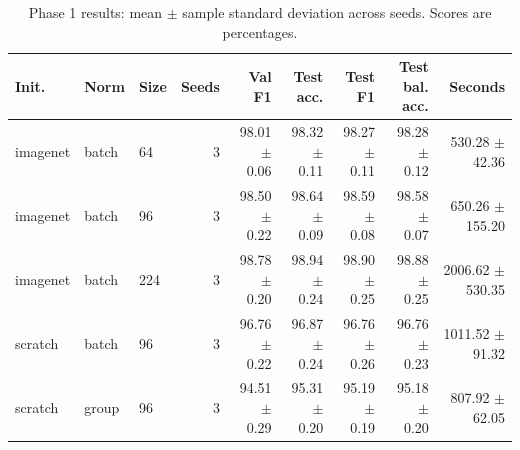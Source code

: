 \begin{table}[t]
\centering
\scriptsize
\caption{Phase 1 results: mean $\pm$ sample standard deviation across seeds. Scores are percentages.}
\begin{tabular}{lllrrrrrr}
\toprule
Init. & Norm & Size & Seeds & Val F1 & Test acc. & Test F1 & Test bal. acc. & Seconds \\
\midrule
imagenet & batch & 64 & 3 & 98.01 $\pm$ 0.06 & 98.32 $\pm$ 0.11 & 98.27 $\pm$ 0.11 & 98.28 $\pm$ 0.12 & 530.28 $\pm$ 42.36 \\
imagenet & batch & 96 & 3 & 98.50 $\pm$ 0.22 & 98.64 $\pm$ 0.09 & 98.59 $\pm$ 0.08 & 98.58 $\pm$ 0.07 & 650.26 $\pm$ 155.20 \\
imagenet & batch & 224 & 3 & 98.78 $\pm$ 0.20 & 98.94 $\pm$ 0.24 & 98.90 $\pm$ 0.25 & 98.88 $\pm$ 0.25 & 2006.62 $\pm$ 530.35 \\
scratch & batch & 96 & 3 & 96.76 $\pm$ 0.22 & 96.87 $\pm$ 0.24 & 96.76 $\pm$ 0.26 & 96.76 $\pm$ 0.23 & 1011.52 $\pm$ 91.32 \\
scratch & group & 96 & 3 & 94.51 $\pm$ 0.29 & 95.31 $\pm$ 0.20 & 95.19 $\pm$ 0.19 & 95.18 $\pm$ 0.20 & 807.92 $\pm$ 62.05 \\
\bottomrule
\end{tabular}
\label{tab:phase1}
\end{table}